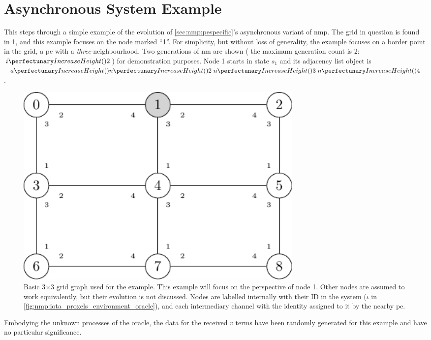 \section{\label{sec:nmp:example}Asynchronous System Example}
\newcommand*{\obinnod}[1]{Objects inside node 1 at the end of round #1}
\newcommand*{\obinrul}[2]{Objects inside node 1 after application of rule#1 during round #2}

This  steps through a simple example of the evolution of \cref{sec:nmp:pespecific}'s asynchronous variant of \gls{nmp}.  The grid in question is found in \cref{fig:nmp:basicgrid}, and this example focuses on the node marked ``1''.  For simplicity, but without loss of generality, the example focuses on a border point in the grid, \ie{} a \gls{pe} with a \emph{three}-neighbourhood.  Two generations of \gls{nm} are shown (\ie{} the maximum generation count is 2: \(\cpfunc{i}{2}\)) for demonstration purposes.  Node 1 starts in state \(s_1\) and its adjacency list object is \(\cpfunc{a}{\cpfunc{n}{2} \; \cpfunc{n}{3} \;\cpfunc{n}{4}}\).

\begin{figure}
    \centering
    \includegraphics[keepaspectratio,width=0.7\textwidth,height=0.3\textheight]{chapters/nmp/images/3by3gridgraph.pdf}
    \caption[Basic 3×3 grid graph used for the example]{Basic 3×3 grid graph used for the example.  This example will focus on the perspective of node 1.  Other nodes are assumed to work equivalently, but their evolution is not discussed.  Nodes are labelled internally with their ID in the system (\(\iota\) in \cref{fig:nmp:iota_proxels_environment_oracle}), and each intermediary channel with the identity assigned to it by the nearby \gls{pe}.}
    \label{fig:nmp:basicgrid}
\end{figure}

Embodying the unknown processes of the oracle, the data for the received \(v\) terms have been randomly generated for this example and have no particular significance.

